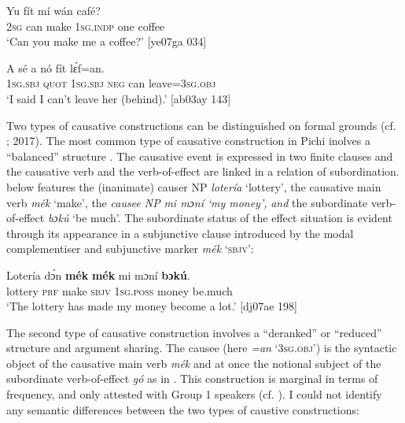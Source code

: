 \ea%
    \label{ex:key:1319}
    \gll Yu  fít      mí    wán    café?\\
\textsc{2sg}  can  make  \textsc{1sg.indp}  one    coffee\\

\glt ‘Can you make me a coffee?’ [ye07ga 034]
\z


\ea%
    \label{ex:key:1320}
    \gll A    sé    a    nó  fít  lɛ́f=an.\\
\textsc{1sg.sbj}  \textsc{quot}    \textsc{1sg.sbj}  \textsc{neg}  can  leave=\textsc{3sg.obj}\\

\glt ‘I said I can’t leave her (behind).’ [ab03ay 143]
\z

Two types of causative constructions can be distinguished on formal grounds (cf. \citealt{Yakpo2012b}; 2017). The most common type of causative construction in Pichi inolves a “balanced” structure \citep{Cristofaro2003}. The causative event is expressed in two finite clauses and the causative verb and the verb-of-effect are linked in a relation of subordination.  below features the (inanimate) causer NP \textit{lotería} ‘lottery’, the causative main verb \textit{mék} ‘make’, the \textit{\textup{causee NP}}\textit{ mi mɔní} \textit{\textup{‘my money’,}}\textit{ and} the subordinate verb-of-effect \textit{bɔkú} ‘be much’. The subordinate status of the effect situation is evident through its appearance in a subjunctive clause introduced by the modal complementiser and subjunctive marker \textit{mék} ‘\textsc{sbjv}’:


\ea%
    \label{ex:key:1321}
    \gll Lotería  dɔ́n  \textbf{mék}    \textbf{mék}    mi    mɔní  \textbf{bɔkú}.\\
lottery  \textsc{prf}  make  \textsc{sbjv}    \textsc{1sg.poss}  money  be.much\\

\glt ‘The lottery has made my money become a lot.’ [dj07ae 198]
\z

The second type of causative construction involves a “deranked” \citep{Cristofaro2003} or “reduced” \citep{Lehmann1988} structure and argument sharing. The causee (here \textit{=an} \textsc{‘3sg.obj’}) is the syntactic object of the causative main verb \textit{mék} and at once the notional subject of the subordinate verb-of-effect \textit{gó} as in . This construction is marginal in terms of frequency, and only attested with Group 1 speakers (cf. ). I could not identify any semantic differences between the two types of caustive constructions:


